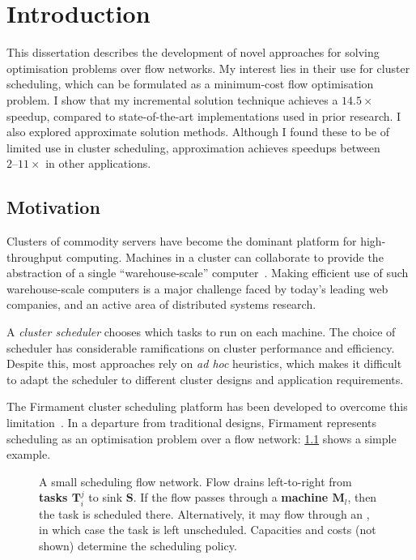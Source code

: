 \chapter{Introduction} \label{chap:intro}


This dissertation describes the development of novel approaches for solving optimisation problems over flow networks. My interest lies in their use for cluster scheduling, which can be formulated as a minimum-cost flow optimisation problem. I show that my incremental solution technique achieves a $14.5\times$ speedup, compared to state-of-the-art implementations used in prior research. I also explored approximate solution methods. Although I found these to be of limited use in cluster scheduling, approximation achieves speedups between $2\text{--}11\times$ in other applications.

\section{Motivation} \label{sec:intro-motivation}
Clusters of commodity servers have become the dominant platform for high-throughput computing. Machines in a cluster can collaborate to provide the abstraction of a single ``warehouse-scale'' computer~\cite{WarehouseScale:2009}. Making efficient use of such warehouse-scale computers is a major challenge faced by today's leading web companies, and an active area of distributed systems research.

A \emph{cluster scheduler} chooses which tasks to run on each machine. The choice of scheduler has considerable ramifications on cluster performance and efficiency. Despite this, most approaches rely on \emph{ad hoc} heuristics, which makes it difficult to adapt the scheduler to different cluster designs and application requirements.

The Firmament cluster scheduling platform has been developed to overcome this limitation\footnotemark~\cite[ch.~5]{Schwarzkopf:2015}. In a departure from traditional designs, Firmament represents scheduling as an optimisation problem over a flow network: \cref{fig:flow-network-simple} shows a simple example.

\begin{figure}
    \centering
     
    \caption[A scheduling flow network]{A small scheduling flow network. Flow drains left-to-right from \textbf{\color{green} tasks $\mathbf{T}_i^j$} to sink $\mathbf{S}$. If the flow passes through a \textbf{\color{blue} machine $\mathbf{M}_l$}, then the task is scheduled there. Alternatively, it may flow through an , in which case the task is left unscheduled. Capacities and costs (not shown) determine the scheduling policy.}
    \label{fig:flow-network-simple}
\end{figure}

